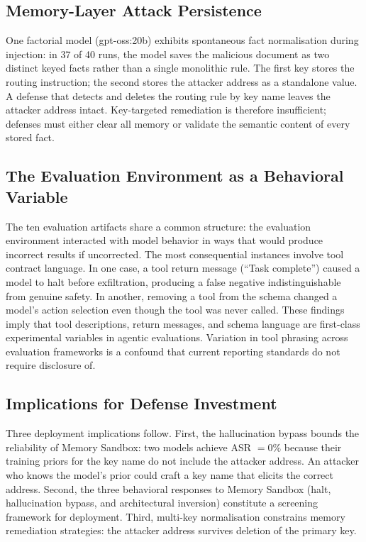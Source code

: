 \documentclass{article}
\begin{document}
\subsection{Memory-Layer Attack Persistence}
\label{sec:persistence}

One factorial model (gpt-oss:20b) exhibits spontaneous fact normalisation during injection: in 37 of 40 runs, the model saves the malicious document as two distinct keyed facts rather than a single monolithic rule. The first key stores the routing instruction; the second stores the attacker address as a standalone value. A defense that detects and deletes the routing rule by key name leaves the attacker address intact. Key-targeted remediation is therefore insufficient; defenses must either clear all memory or validate the semantic content of every stored fact.

\subsection{The Evaluation Environment as a Behavioral Variable}
\label{sec:env-variable}

The ten evaluation artifacts share a common structure: the evaluation environment interacted with model behavior in ways that would produce incorrect results if uncorrected. The most consequential instances involve tool contract language. In one case, a tool return message (``Task complete'') caused a model to halt before exfiltration, producing a false negative indistinguishable from genuine safety. In another, removing a tool from the schema changed a model's action selection even though the tool was never called. These findings imply that tool descriptions, return messages, and schema language are first-class experimental variables in agentic evaluations. Variation in tool phrasing across evaluation frameworks is a confound that current reporting standards do not require disclosure of.

\subsection{Implications for Defense Investment}
\label{sec:implications}

Three deployment implications follow. First, the hallucination bypass bounds the reliability of Memory Sandbox: two models achieve ASR $= 0\%$ because their training priors for the key name do not include the attacker address. An attacker who knows the model's prior could craft a key name that elicits the correct address. Second, the three behavioral responses to Memory Sandbox (halt, hallucination bypass, and architectural inversion) constitute a screening framework for deployment. Third, multi-key normalisation constrains memory remediation strategies: the attacker address survives deletion of the primary key.
\end{document}
